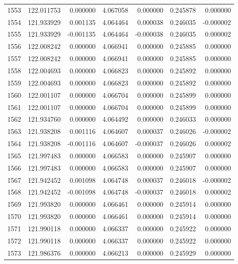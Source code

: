 \begin{tabular}{rrrrrrr}
1553 & 122.011753 &    0.000000 &  4.067058 &    0.000000 &    0.245878 &  0.000000 \\
1554 & 121.933929 &    0.001135 &  4.064464 &    0.000038 &    0.246035 & -0.000002 \\
1555 & 121.933929 &   -0.001135 &  4.064464 &   -0.000038 &    0.246035 &  0.000002 \\
1556 & 122.008242 &    0.000000 &  4.066941 &    0.000000 &    0.245885 &  0.000000 \\
1557 & 122.008242 &    0.000000 &  4.066941 &    0.000000 &    0.245885 &  0.000000 \\
1558 & 122.004693 &    0.000000 &  4.066823 &    0.000000 &    0.245892 &  0.000000 \\
1559 & 122.004693 &    0.000000 &  4.066823 &    0.000000 &    0.245892 &  0.000000 \\
1560 & 122.001107 &    0.000000 &  4.066704 &    0.000000 &    0.245899 &  0.000000 \\
1561 & 122.001107 &    0.000000 &  4.066704 &    0.000000 &    0.245899 &  0.000000 \\
1562 & 121.934760 &    0.000000 &  4.064492 &    0.000000 &    0.246033 &  0.000000 \\
1563 & 121.938208 &    0.001116 &  4.064607 &    0.000037 &    0.246026 & -0.000002 \\
1564 & 121.938208 &   -0.001116 &  4.064607 &   -0.000037 &    0.246026 &  0.000002 \\
1565 & 121.997483 &    0.000000 &  4.066583 &    0.000000 &    0.245907 &  0.000000 \\
1566 & 121.997483 &    0.000000 &  4.066583 &    0.000000 &    0.245907 &  0.000000 \\
1567 & 121.942452 &    0.001098 &  4.064748 &    0.000037 &    0.246018 & -0.000002 \\
1568 & 121.942452 &   -0.001098 &  4.064748 &   -0.000037 &    0.246018 &  0.000002 \\
1569 & 121.993820 &    0.000000 &  4.066461 &    0.000000 &    0.245914 &  0.000000 \\
1570 & 121.993820 &    0.000000 &  4.066461 &    0.000000 &    0.245914 &  0.000000 \\
1571 & 121.990118 &    0.000000 &  4.066337 &    0.000000 &    0.245922 &  0.000000 \\
1572 & 121.990118 &    0.000000 &  4.066337 &    0.000000 &    0.245922 &  0.000000 \\
1573 & 121.986376 &    0.000000 &  4.066213 &    0.000000 &    0.245929 &  0.000000 \\

\end{tabular}
